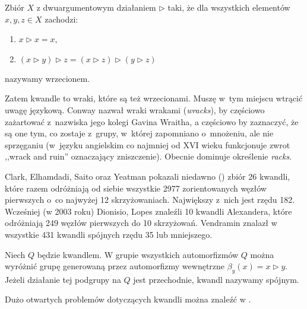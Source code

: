 \begin{definition}[wrzeciono]
%
    Zbiór $X$ z dwuargumentowym działaniem $\triangleright$ taki, że dla wszystkich elementów $x, y, z \in X$ zachodzi:
    \begin{enumerate}
        \item $x \triangleright x = x$,
        \item $(x \triangleright y) \triangleright z = (x \triangleright z) \triangleright (y \triangleright z)$
    \end{enumerate}
    nazywamy wrzecionem.
\end{definition}

Zatem kwandle to wraki, które są też wrzecionami.
Muszę w~tym miejscu wtrącić uwagę językową.
Conway nazwał wraki wrakami (\emph{wracks}), by częściowo zażartować z~nazwiska jego kolegi Gavina Wraitha, a częściowo by zaznaczyć, że są one tym, co zostaje z~grupy, w~której zapomniano o~mnożeniu, ale nie sprzęganiu (w~języku angielskim co najmniej od XVI wieku funkcjonuje zwrot ,,wrack and ruin'' oznaczający zniszczenie).
Obecnie dominuje określenie \emph{racks}.

Clark, Elhamdadi, Saito oraz Yeatman pokazali niedawno (\cite{clark13}) zbiór 26 kwandli, które razem odróżniają od siebie wszystkie 2977 zorientowanych węzłów pierwszych o~co najwyżej 12 skrzyżowaniach.
Największy z~nich jest rzędu 182.
Wcześniej (w 2003 roku) Dionisio, Lopes znaleźli 10 kwandli Alexandera, które odróżniają 249 węzłów pierwszych do 10 skrzyżowań.
Vendramin znalazł w \cite{vendramin12} wszystkie 431 kwandli spójnych rzędu 35 lub mniejszego.

\begin{definition}
    Niech $Q$ będzie kwandlem.
    W grupie wszystkich automorfizmów $Q$ można wyróżnić grupę generowaną przez automorfizmy wewnętrzne $\beta_y(x) = x \triangleright y$.
    Jeżeli działanie tej podgrupy na $Q$ jest przechodnie, kwandl nazywamy spójnym.
\end{definition}

Dużo otwartych problemów dotyczących kwandli można znaleźć w \cite[s. 455-465]{ohtsuki02}.



